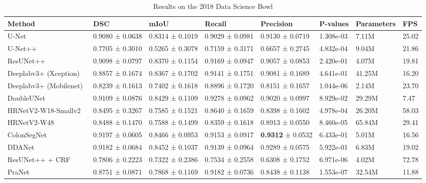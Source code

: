 \documentclass[journal,twoside,web]{IEEEtran}
\begin{document}
\begin{table*}[!t]
\centering

\scriptsize
\caption{Results on the 2018 Data Science Bowl}
\label{tab:result3}
\begin{tabular}{@{}l|l|l|l|l|l|l|l@{}}
\toprule
\textbf{Method} & \textbf{DSC} & \textbf{mIoU}& \textbf{Recall} & \textbf{Precision} & \textbf{P-values} & \textbf{Parameters} & \textbf{FPS}\\ 
\hline
\hline
U-Net~\cite{ronneberger2015u} & 0.9080 ± 0.0638 & 0.8314 ± 0.1019 & 0.9029 ± 0.0981 & 0.9130 ± 0.0719 & 1.308e-03 & 7.11M & 25.02    \\ \hline
U-Net++~\cite{zhou2019unet++}  & 0.7705 ± 0.3010 & 0.5265 ± 0.3078 & 0.7159 ± 0.3171& 0.6657 ± 0.2745 & 4.832e-04 & 9.04M & 21.86\\ \hline
ResUNet++~\cite{jha2019resunet++} & 0.9098 ± 0.0797 & 0.8370 ± 0.1154 & 0.9169 ± 0.0947 & 0.9057 ± 0.0853 & 2.420e-01 & 4.07M & 19.81 \\ \hline
Deeplabv3+ (Xception)~\cite{chen2018encoder} & 0.8857 ± 0.1674 & 0.8367 ± 0.1702 & 0.9141 ± 0.1751 & 0.9081 ± 0.1689 & 4.641e-01 & 41.25M & 16.20 \\\hline
Deeplabv3+ (Mobilenet)~\cite{chen2018encoder} & 0.8239 ± 0.1613 & 0.7402 ± 0.1618 & 0.8896 ± 0.1720 & 0.8151 ±  0.1657 & 1.044e-06 & 2.14M & 23.70 \\ \hline
DoubleUNet~\cite{jha2020doubleu} & 0.9109 ± 0.0876 & 0.8429 ± 0.1109 &  0.9278 ± 0.0962 & 0.9020 ± 0.0997 & 8.929e-02 & 29.29M & 7.47 \\ \hline
HRNetV2-W18-Smallv2~\cite{Wang_2020} & 0.8495 ± 0.3267 & 0.7585 ± 0.1521 & 0.8640 ± 0.1659 & 0.8398 ± 0.1602 & 4.978e-04 & 26.20M & 58.03  \\ \hline 
HRNetV2-W48~\cite{Wang_2020} & 0.8488 ± 0.1470 & 0.7588 ± 0.1499 & 0.8359 ± 0.1618 & 0.8913 ± 0.0550 & 8.460e-05 & 65.84M & 29.41  \\ \hline
ColonSegNet~\cite{jha2021real} & 0.9197 ± 0.0605 & 0.8466 ± 0.0953 & 0.9153 ± 0.0917  & \textbf{0.9312} ± 0.0532 & 6.433e-01 & 5.01M & 16.56  \\ \hline
DDANet~\cite{tomar2020ddanet} & 0.9182 ± 0.0684 & 0.8452 ± 0.1037  & 0.9139 ± 0.0964 & 0.9289 ± 0.0575 & 5.922e-01 & 6.83M & 19.02 \\ \hline
ResUNet++ + CRF~\cite{jha2021comprehensive}& 0.7806 ± 0.2223 & 0.7322 ± 0.2386 & 0.7534 ± 0.2558 & 0.6308 ± 0.1752 & 6.971e-06 & 4.02M & 72.78 \\ \hline
PraNet~\cite{fan2020pranet}  &0.8751 ± 0.0871 & 0.7868 ± 0.1169 & 0.9182 ± 0.0736 & 0.8438 ± 0.1138 & 1.553e-07 & 32.54M & 11.88 \\ \hline

\end{tabular}
\end{table*}
\end{document}

